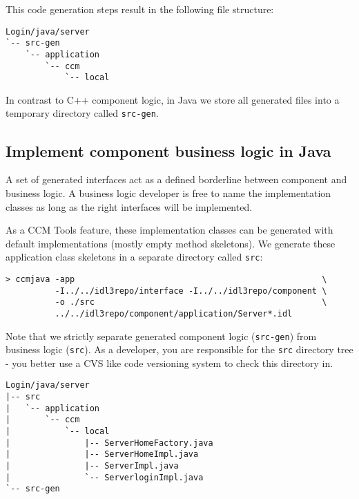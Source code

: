 This code generation steps result in the following file structure:
\begin{footnotesize}
\begin{verbatim}
Login/java/server
`-- src-gen
    `-- application
        `-- ccm
            `-- local
\end{verbatim}
\end{footnotesize}

In contrast to C++ component logic, in Java we store all generated files into a
temporary directory called {\tt src-gen}.


\subsection{Implement component business logic in Java}
\label{subsection:ImplementBusinessLogicInJava}

A set of generated interfaces act as a defined borderline between component
and business logic. A business logic developer is free to name the
implementation classes as long as the right interfaces will be implemented. 

\vspace{3mm}
As a CCM Tools feature, these implementation classes can be generated with
default implementations (mostly empty method skeletons).
We generate these application class skeletons in a separate directory called {\tt src}: 
\begin{footnotesize}
\begin{verbatim}
> ccmjava -app                                                  \
          -I../../idl3repo/interface -I../../idl3repo/component \
          -o ./src                                              \
          ../../idl3repo/component/application/Server*.idl      
\end{verbatim}
\end{footnotesize}
Note that we strictly separate generated component logic ({\tt src-gen})
from business logic ({\tt src}). 
As a developer, you are responsible for the {\tt src} directory tree - you
better use a CVS like code versioning system to check this directory in.
\begin{footnotesize}
\begin{verbatim}
Login/java/server
|-- src
|   `-- application
|       `-- ccm
|           `-- local
|               |-- ServerHomeFactory.java
|               |-- ServerHomeImpl.java
|               |-- ServerImpl.java
|               `-- ServerloginImpl.java
`-- src-gen
\end{verbatim}
\end{footnotesize}

